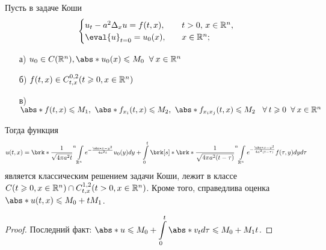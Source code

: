 	\begin{theorem}
		Пусть в задаче Коши
			\begin{equation*}
				\begin{cases}
					u_t - a^2 \Delta_x u = f(t,x), \quad & t > 0, \, x \in \R^n,\\
					\eval{u}_{t=0} = u_0(x), \quad & x \in \R^n;
				\end{cases}
			\end{equation*}
		\begin{itemize}
			\item[а)] $u_0 \in C(\R^n), \abs*{u_0(x)} \leqslant M_0 \Forall x \in \R^n$
			\item[б)] $f(t,x) \in C^{0,2}_{t,x}(t \geqslant 0, x \in \mathbb{R}^n)$ 
            \item[в)] $\abs*{f(t,x)}\leq M_1,\ \abs*{f_{x_i}(t,x)}\leq M_2,\ \abs*{f_{x_ix_j}(t,x)}\leq M_2\ \Forall t\geq 0 \Forall x\in\R^n$ 
		\end{itemize}
		Тогда функция $$u(t,x) = \brk*{\dfrac{1}{\sqrt{4\pi a^2t}}}^n \displaystyle\int\limits_{\R^n} e^{-\frac{\abs*{x-y}^2}{4a^2t}} u_0(y)dy + \displaystyle\int\limits_0^t \brk[s]*{\brk*{\dfrac{1}{\sqrt{4\pi a^2(t-\tau)}}}^n \displaystyle\int\limits_{\R^n} e^{-\frac{\abs*{x-y}^2}{4a^2(t-\tau)}} f(\tau,y) dy} d\tau$$
		является классическим решением задачи Коши, лежит в классе $C(t \geqslant 0, x \in \mathbb{R}^n) \cap C^{1,2}_{t,x}(t > 0, x \in \mathbb{R}^n)$. Кроме того, справедлива оценка $\abs*{u(t,x)} \leqslant M_0 + tM_1$.
	\end{theorem}
	\begin{proof}
		Последний факт: $\abs*{u} \leqslant M_0 + \displaystyle\int\limits_0^t \abs*{v_t} d\tau \leqslant M_0 + M_1t$.
	\end{proof}